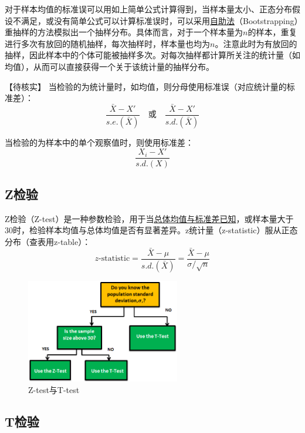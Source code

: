 \documentclass[11pt]{article}
\begin{document}
对于样本均值的标准误可以用如上简单公式计算得到，当样本量太小、正态分布假设不满足，或没有简单公式可以计算标准误时，可以采用\uline{自助法}（Bootstrapping）重抽样的方法模拟出一个抽样分布。具体而言，对于一个样本量为$n$的样本，重复进行多次有放回的随机抽样，每次抽样时，样本量也均为$n$。注意此时为有放回的抽样，因此样本中的个体可能被抽样多次。对每次抽样都计算所关注的统计量（如均值），从而可以直接获得一个关于该统计量的抽样分布。

【待核实】
当检验的为统计量时，如均值，则分母使用标准误（对应统计量的标准差）：
\begin{equation*}
    \frac{\bar{X} - X'}{s.e.(\bar{X})} \quad\text{或}\quad \frac{\bar{X} - X'}{s.d.(\bar{X})}
\end{equation*}

当检验的为样本中的单个观察值时，则使用标准差：
\begin{equation*}
    \frac{X_i - X'}{s.d.(X)}
\end{equation*}

\subsection{Z检验}

Z检验（Z-test）是一种参数检验，用于当\uline{总体均值与标准差已知}，或样本量大于30时，检验样本均值与总体均值是否有显著差异。z统计量（z-statistic）服从正态分布（查表用z-table）：
\begin{equation*}
    z\text{-statistic} = \frac{\bar{X}-\mu}{s.d.(\bar{X})} = \frac{\bar{X} - \mu}{\sigma/\sqrt{n}}
\end{equation*}

\begin{figure}[H]
    \centering
    \includegraphics[width=0.6\textwidth]{fig/z-vs-t-test.png}
    \caption{Z-test与T-test}
    \label{fig:z-vs-t-test}
\end{figure}

\subsection{T检验}
\end{document}

